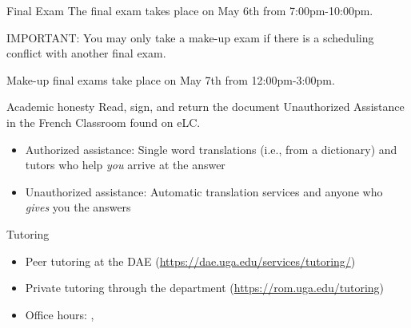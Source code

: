 \begin{frame}{Final Exam}
  The final exam takes place on \alert{May 6th} from \alert{7:00pm-10:00pm}.
  \begin{center}
    \alert{IMPORTANT}: You may only take a make-up exam if there is a scheduling conflict with another final exam.
  \end{center}
  Make-up final exams take place on May 7th from 12:00pm-3:00pm.
\end{frame}

\begin{frame}{Academic honesty}
  Read, sign, and return the document Unauthorized Assistance in the French Classroom found on eLC.
  \begin{itemize}
    \item Authorized assistance: Single word translations (i.e., from a dictionary) and tutors who help \emph{you} arrive at the answer
    \item Unauthorized assistance: Automatic translation services and anyone who \emph{gives} you the answers
  \end{itemize}
\end{frame}

\begin{frame}{Tutoring}
  \begin{itemize}
    \item Peer tutoring at the DAE (\url{https://dae.uga.edu/services/tutoring/})
    \item Private tutoring through the department (\url{https://rom.uga.edu/tutoring})
    \item Office hours: , 
  \end{itemize}
\end{frame}